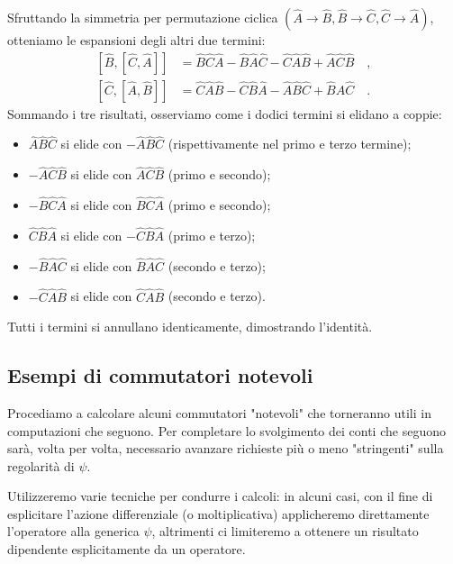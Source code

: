 \begin{enumerate}
Sfruttando la simmetria per permutazione ciclica $(\hat{A} \to \hat{B}, \hat{B} \to \hat{C}, \hat{C} \to \hat{A})$, otteniamo le espansioni degli altri due termini:
\begin{equation*}
    \begin{aligned}
        [\hat{B}, [\hat{C}, \hat{A}]] &= \hat{B}\hat{C}\hat{A} - \hat{B}\hat{A}\hat{C} - \hat{C}\hat{A}\hat{B} + \hat{A}\hat{C}\hat{B} \quad, \\
        [\hat{C}, [\hat{A}, \hat{B}]] &= \hat{C}\hat{A}\hat{B} - \hat{C}\hat{B}\hat{A} - \hat{A}\hat{B}\hat{C} + \hat{B}\hat{A}\hat{C} \quad.
    \end{aligned}
\end{equation*}
Sommando i tre risultati, osserviamo come i dodici termini si elidano a coppie:
\begin{itemize}[noitemsep]
    \item $\hat{A}\hat{B}\hat{C}$ si elide con $-\hat{A}\hat{B}\hat{C}$ (rispettivamente nel primo e terzo termine);
    \item $-\hat{A}\hat{C}\hat{B}$ si elide con $\hat{A}\hat{C}\hat{B}$ (primo e secondo);
    \item $-\hat{B}\hat{C}\hat{A}$ si elide con $\hat{B}\hat{C}\hat{A}$ (primo e secondo);
    \item $\hat{C}\hat{B}\hat{A}$ si elide con $-\hat{C}\hat{B}\hat{A}$ (primo e terzo);
    \item $-\hat{B}\hat{A}\hat{C}$ si elide con $\hat{B}\hat{A}\hat{C}$ (secondo e terzo);
    \item $-\hat{C}\hat{A}\hat{B}$ si elide con $\hat{C}\hat{A}\hat{B}$ (secondo e terzo).
\end{itemize}
Tutti i termini si annullano identicamente, dimostrando l'identità.
\end{enumerate}

\subsection{Esempi di commutatori notevoli}
Procediamo a calcolare alcuni commutatori "notevoli" che torneranno utili in computazioni che seguono. Per completare lo svolgimento dei conti che seguono sarà, volta per volta, necessario avanzare richieste più o meno "stringenti" sulla regolarità di $\psi$. 

Utilizzeremo varie tecniche per condurre i calcoli: in alcuni casi, con il fine di esplicitare l'azione differenziale (o moltiplicativa) applicheremo direttamente l'operatore alla generica $\psi$, altrimenti ci limiteremo a ottenere un risultato dipendente esplicitamente da un operatore. 

